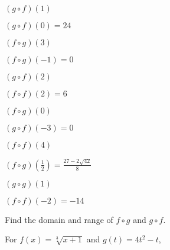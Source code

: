 \documentclass{ximera}
\begin{document}
\begin{question}
$(g\circ f)(1)$
\begin{solution}
$(g\circ f)(0) = 24$
\end{solution}

\end{question}

\begin{question}
$(f \circ g)(3)$
\begin{solution}
$(f\circ g)(-1) = 0$
\end{solution}

\end{question}

\begin{question}
$(g\circ f)(2)$
\begin{solution}
$(f \circ f)(2) = 6$








\end{solution}

\end{question}

\begin{question}
$(f\circ g)(0)$
\begin{solution}
$(g\circ f)(-3) = 0$
\end{solution}

\end{question}

\begin{question}
$(f\circ f)(4)$
\begin{solution}
$(f\circ g)\left(\frac{1}{2}\right) = \frac{27-2\sqrt{42}}{8}$
\end{solution}

\end{question}

\begin{question}
$(g \circ g)(1)$ 

\begin{solution}
$(f \circ f)(-2) = -14$





\newpage
\end{solution}

\end{question}

\begin{question}
Find the domain and range of $f \circ g$ and $g \circ f$.

\begin{solution}
For  $f(x) = \sqrt[3]{x+1}$ and $g(t) = 4t^2-t$,



\end{solution}

\end{question}
\end{document}
